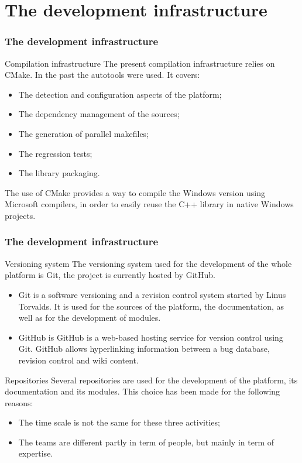 \documentclass[8pt]{beamer}
\begin{document}
\section[The development infrastructure]{The development infrastructure}
\begin{frame}
  \frametitle{The development infrastructure}
  \begin{block}{Compilation infrastructure}
    The present compilation infrastructure relies on CMake.
    In the past the autotools were used. 
    It covers:
    \begin{itemize}
    \item The detection and configuration aspects of the platform;
    \item The dependency management of the sources;
    \item The generation of parallel makefiles;
    \item The regression tests;
    \item The library packaging.
    \end{itemize}
    The use of CMake provides a way to compile the Windows version using Microsoft compilers, in order to easily reuse the C++ library in native Windows projects.
  \end{block}
\end{frame}
\begin{frame}
  \frametitle{The development infrastructure}
  \begin{block}{Versioning system}
    The versioning system used for the development of the whole platform is Git, the project is currently hosted by GitHub.
    \begin{itemize}
    \item \alert{Git} is a software versioning and a revision control system started by Linus Torvalds. It is used for the sources of the platform, the documentation, as well as for the development of modules.
    \item \alert{GitHub} is GitHub is a web-based hosting service for version control using Git. GitHub allows hyperlinking information between a bug database, revision control and wiki content.
    \end{itemize}
  \end{block}
  \begin{block}{Repositories}
    Several repositories are used for the development of the platform, its documentation and its modules. This choice has been made for the following reasons:
    \begin{itemize}
    \item The time scale is not the same for these three activities;
    \item The teams are different partly in term of people, but mainly in term of expertise.
    \end{itemize}
  \end{block}
\end{frame}
\end{document}
